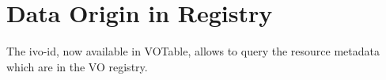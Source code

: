 \documentclass[11pt,a4paper]{ivoa}
\begin{document}
%
%
%
%
%

\section{Data Origin in Registry}
The ivo-id, now available in VOTable, allows to query the resource metadata which are in the VO registry.\\
\end{document}
